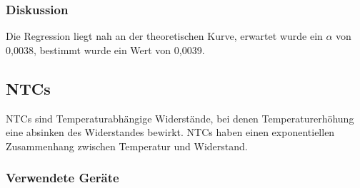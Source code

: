 \documentclass[12pt,a4paper]{article}
\begin{document}
\subsubsection*{Diskussion}

Die Regression liegt nah an der theoretischen Kurve, erwartet wurde ein $\alpha$ von 0,0038, bestimmt wurde ein Wert von 0,0039.

\subsection{NTCs}

NTCs sind Temperaturabhängige Widerstände, bei denen Temperaturerhöhung eine absinken des Widerstandes bewirkt. NTCs haben einen exponentiellen Zusammenhang zwischen Temperatur und Widerstand.

\subsubsection*{Verwendete Geräte}
\end{document}
